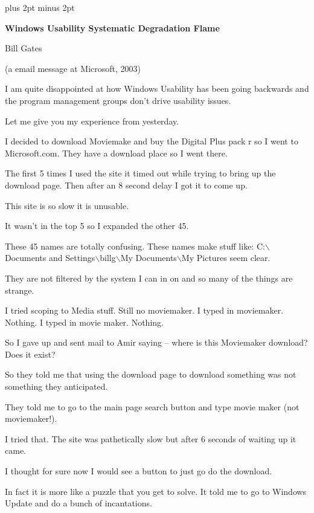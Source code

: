 \parindent=0pt\parskip=10pt plus 2pt minus 2pt%
\centerline{\bf Windows Usability Systematic Degradation Flame}
\centerline{Bill Gates}
\centerline{(a email message at Microsoft, 2003)}

\bigskip
{}
\medskip

I am quite disappointed at how Windows Usability has been going backwards and
the program management groups don't drive usability issues.

Let me give you my experience from yesterday.

I decided to download Moviemake and buy the Digital Plus pack r so I went to Microsoft.com.
They have a download place so I went there.

The first 5 times I used the site it timed out while trying to bring up the download page.
Then after an 8 second delay I got it to come up.

This site is so slow it is unusable.

It wasn't in the top 5 so I expanded the other 45.

These 45 names are totally confusing.
These names make stuff like:
C:$\backslash$Documents and Settings$\backslash$billg$\backslash$My
Documents$\backslash$My Pictures seem clear.

They are not filtered by the system I can in on and so many of the things are
strange.

I tried scoping to Media stuff.
Still no moviemaker.
I typed in moviemaker. Nothing.
I typed in movie maker. Nothing.

So I gave up and sent mail to Amir saying -- where is this Moviemaker
download? Does it exist?

So they told me that using the download page to download something was not
something they anticipated.

They told me to go to the main page search button and type movie maker (not
moviemaker!).

I tried that.
The site was pathetically slow but after 6 seconds of waiting up it came.

I thought for sure now I would see a button to just go do the download.

In fact it is more like a puzzle that you get to solve.
It told me to go to Windows Update and do a bunch of incantations.

